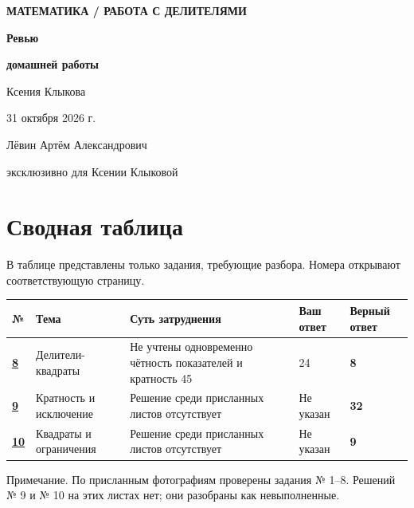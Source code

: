 \documentclass[a4paper,11pt]{article}
\begin{document}
\begin{titlepage}
\thispagestyle{empty}
\centering
\vspace*{23mm}
{\footnotesize\bfseries\textcolor{accent}{МАТЕМАТИКА \; / \; РАБОТА С ДЕЛИТЕЛЯМИ}}\par
\vspace{23mm}
{\Huge\bfseries\color{ink}Ревью\par}
\vspace{3mm}
{\Huge\bfseries\color{ink}домашней работы\par}
\vspace{15mm}
{\large Ксения Клыкова}\par
\vspace{10mm}
{\normalsize\textcolor{muted}{31 октября 2026 г.}}\par
\vfill
{\normalsize Лёвин Артём Александрович}\par
\vspace{3mm}
{\small\textcolor{muted}{эксклюзивно для Ксении Клыковой}}\par
\vspace{11mm}
\vspace{9mm}
\end{titlepage}

\section*{Сводная таблица}
\textcolor{muted}{В таблице представлены только задания, требующие разбора. Номера открывают соответствующую страницу.}\par
\vspace{6mm}
{\small
\begin{tabular}{@{}p{10mm}p{27mm}p{54mm}p{22mm}p{23mm}@{}}
\toprule
\textbf{№} & \textbf{Тема} & \textbf{Суть затруднения} & \textbf{Ваш ответ} & \textbf{Верный ответ}\\
\midrule
\hyperref[task:8]{\textbf{8}} & Делители-квадраты & Не учтены одновременно чётность показателей и кратность 45 & 24 & \textbf{8}\\
\addlinespace[4pt]
\hyperref[task:9]{\textbf{9}} & Кратность и исключение & Решение среди присланных листов отсутствует & Не указан & \textbf{32}\\
\addlinespace[4pt]
\hyperref[task:10]{\textbf{10}} & Квадраты и ограничения & Решение среди присланных листов отсутствует & Не указан & \textbf{9}\\
\bottomrule
\end{tabular}\par
}
\vspace{8mm}
\textcolor{muted}{Примечание. По присланным фотографиям проверены задания № 1--8. Решений № 9 и № 10 на этих листах нет; они разобраны как невыполненные.}
\end{document}
